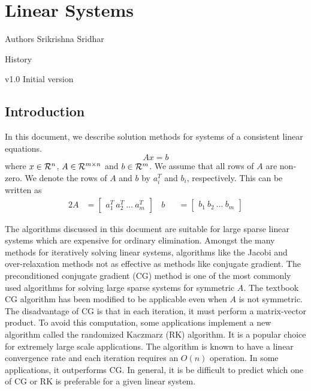 \chapter[linear-systems]{Linear Systems}
\begin{moduleinfo}
\item[Authors] {Srikrishna Sridhar}
\item[History]
	\begin{modulehistory}
		\item[v1.0] Initial version
	\end{modulehistory}
\end{moduleinfo}

\section{Introduction}\label{sec:intro}
In this document, we describe solution methods for systems of a consistent
linear equations.
\begin{equation}
  \label{eq:linear_system}
  Ax = b
\end{equation}
where $x \in \mathcal{R}^{n}$, $A \in \mathcal{R}^{m \times n}$ and $b \in \mathcal{R}^{m}$. We assume
that all rows of $A$ are non-zero. We denote the rows of $A$ and $b$ 
by $a^T_i$ and $b_i$, respectively. This can be written
as 
\begin{alignat}{2}
A &= \begin{bmatrix} a^T_1 \  a^T_2  \  \ldots \  a^T_m   \end{bmatrix} \ \ \ \ 
b &&= \begin{bmatrix} b_1  \  b_2   \ \ldots \  b_m   \end{bmatrix}
\end{alignat}

\noindent
The algorithms discussed in this document are suitable for large sparse
linear systems which are expensive for ordinary elimination. Amongst the many methods for 
iteratively solving linear systems, algorithms like the Jacobi and over-relaxation
methods not as effective as methods like conjugate gradient. The preconditioned 
conjugate gradient (CG) method is one of the most commonly used algorithms for 
solving large sparse systems for symmetric $A$. The textbook CG algorithm has been modified
to be applicable even when $A$ is not symmetric. The disadvantage of CG is that
in each iteration, it must perform a matrix-vector product. To avoid this computation, 
some applications implement a new algorithm called the randomized Kaczmarz (RK) 
algorithm. It is a popular choice for extremely large scale applications. 
The algorithm is known to have a linear convergence rate and each iteration 
requires an $O(n)$ operation. In some applications, it outperforms CG. In
general, it is be difficult to predict which one of CG or RK is preferable
for a given linear system.

